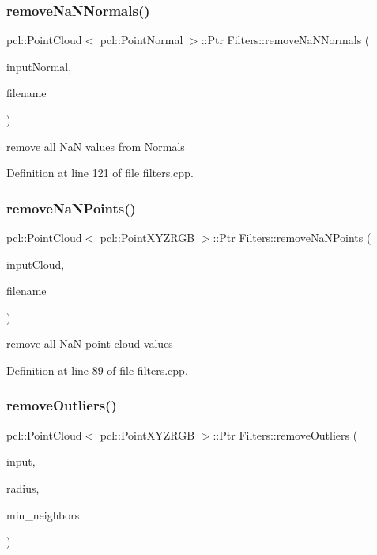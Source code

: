 \subsubsection{\texorpdfstring{remove\+Na\+N\+Normals()}{removeNaNNormals()}}
{\footnotesize\ttfamily pcl\+::\+Point\+Cloud$<$ pcl\+::\+Point\+Normal $>$\+::Ptr Filters\+::remove\+Na\+N\+Normals (\begin{DoxyParamCaption}\item[{const pcl\+::\+Point\+Cloud$<$ pcl\+::\+Point\+Normal $>$\+::Ptr \&}]{input\+Normal,  }\item[{const std\+::string}]{filename }\end{DoxyParamCaption})}

remove all NaN values from Normals 

Definition at line 121 of file filters.\+cpp.

\hypertarget{class_filters_a478cc3062b2a6fff3c2430cb10c86aba}{}\label{class_filters_a478cc3062b2a6fff3c2430cb10c86aba} 
\subsubsection{\texorpdfstring{remove\+Na\+N\+Points()}{removeNaNPoints()}}
{\footnotesize\ttfamily pcl\+::\+Point\+Cloud$<$ pcl\+::\+Point\+X\+Y\+Z\+R\+GB $>$\+::Ptr Filters\+::remove\+Na\+N\+Points (\begin{DoxyParamCaption}\item[{const pcl\+::\+Point\+Cloud$<$ pcl\+::\+Point\+X\+Y\+Z\+R\+GB $>$\+::Ptr \&}]{input\+Cloud,  }\item[{const std\+::string}]{filename }\end{DoxyParamCaption})}

remove all NaN point cloud values 

Definition at line 89 of file filters.\+cpp.

\hypertarget{class_filters_aade8ae78e3f5490db23213b8fc63215b}{}\label{class_filters_aade8ae78e3f5490db23213b8fc63215b} 
\subsubsection{\texorpdfstring{remove\+Outliers()}{removeOutliers()}}
{\footnotesize\ttfamily pcl\+::\+Point\+Cloud$<$ pcl\+::\+Point\+X\+Y\+Z\+R\+GB $>$\+::Ptr Filters\+::remove\+Outliers (\begin{DoxyParamCaption}\item[{const pcl\+::\+Point\+Cloud$<$ pcl\+::\+Point\+X\+Y\+Z\+R\+GB $>$\+::Ptr \&}]{input,  }\item[{float}]{radius,  }\item[{int}]{min\+\_\+neighbors }\end{DoxyParamCaption})}

